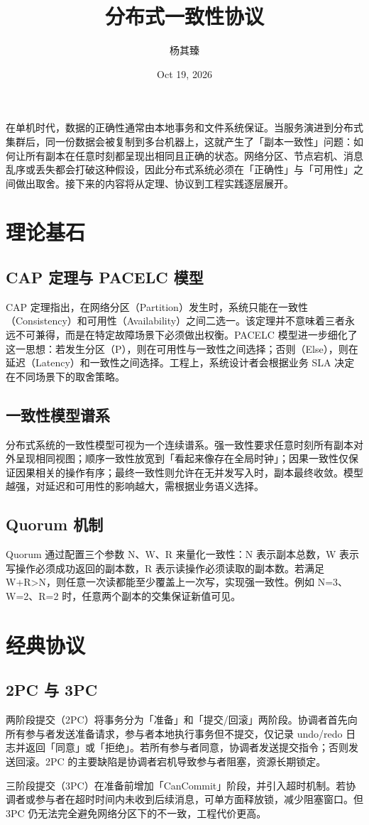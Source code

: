 \title{分布式一致性协议}
\author{杨其臻}
\date{Oct 19, 2026}
\maketitle
在单机时代，数据的正确性通常由本地事务和文件系统保证。当服务演进到分布式集群后，同一份数据会被复制到多台机器上，这就产生了「副本一致性」问题：如何让所有副本在任意时刻都呈现出相同且正确的状态。网络分区、节点宕机、消息乱序或丢失都会打破这种假设，因此分布式系统必须在「正确性」与「可用性」之间做出取舍。接下来的内容将从定理、协议到工程实践逐层展开。\par
\chapter{理论基石}
\section{CAP 定理与 PACELC 模型}
CAP 定理指出，在网络分区（Partition）发生时，系统只能在一致性（Consistency）和可用性（Availability）之间二选一。该定理并不意味着三者永远不可兼得，而是在特定故障场景下必须做出权衡。PACELC 模型进一步细化了这一思想：若发生分区（P），则在可用性与一致性之间选择；否则（Else），则在延迟（Latency）和一致性之间选择。工程上，系统设计者会根据业务 SLA 决定在不同场景下的取舍策略。\par
\section{一致性模型谱系}
分布式系统的一致性模型可视为一个连续谱系。强一致性要求任意时刻所有副本对外呈现相同视图；顺序一致性放宽到「看起来像存在全局时钟」；因果一致性仅保证因果相关的操作有序；最终一致性则允许在无并发写入时，副本最终收敛。模型越强，对延迟和可用性的影响越大，需根据业务语义选择。\par
\section{Quorum 机制}
Quorum 通过配置三个参数 N、W、R 来量化一致性：N 表示副本总数，W 表示写操作必须成功返回的副本数，R 表示读操作必须读取的副本数。若满足 W+R>N，则任意一次读都能至少覆盖上一次写，实现强一致性。例如 N=3、W=2、R=2 时，任意两个副本的交集保证新值可见。\par
\chapter{经典协议}
\section{2PC 与 3PC}
两阶段提交（2PC）将事务分为「准备」和「提交/回滚」两阶段。协调者首先向所有参与者发送准备请求，参与者本地执行事务但不提交，仅记录 undo/redo 日志并返回「同意」或「拒绝」。若所有参与者同意，协调者发送提交指令；否则发送回滚。2PC 的主要缺陷是协调者宕机导致参与者阻塞，资源长期锁定。\par
三阶段提交（3PC）在准备前增加「CanCommit」阶段，并引入超时机制。若协调者或参与者在超时时间内未收到后续消息，可单方面释放锁，减少阻塞窗口。但 3PC 仍无法完全避免网络分区下的不一致，工程代价更高。\par
